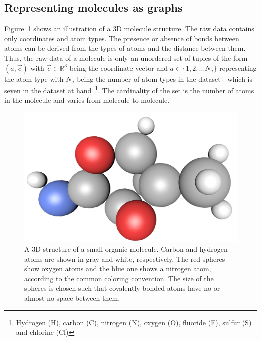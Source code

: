 
\subsection{Representing molecules as graphs}
\label{sec:molecules-as-graphs}

Figure~\ref{fig:molecule-3d} shows an illustration of a 3D molecule structure. The raw data contains only coordinates and atom types. The presence or absence of bonds between atoms can be derived from the types of atoms and the distance between them. Thus, the raw data of a molecule is only an unordered set of tuples of the form $(a, \vec{c})$
with $\vec{c} \in \mathbb{R}^3$ being the coordinate vector
and $a \in \{1, 2, ... N_a\} $ representing the atom type with $N_a$ being the number of atom-types in the dataset - which is seven in the dataset at hand~\footnote{
	Hydrogen (H), carbon (C), nitrogen (N), oxygen (O), fluoride (F), sulfur (S) and chlorine (Cl)
}. The cardinality of the set is the number of atoms in the molecule and varies from molecule to molecule.

\begin{figure}[H]
	\centering
	\includegraphics[width=\linewidth]{figures/molecule-3d-1}
	\caption{A 3D structure of a small organic molecule. Carbon and hydrogen atoms are shown in gray and white, respectively. The red spheres show oxygen atoms and the blue one shows a nitrogen atom, according to the common coloring convention. The size of the spheres is chosen such that covalently bonded atoms have no or almost no space between them.
}
	\label{fig:molecule-3d}
\end{figure}

